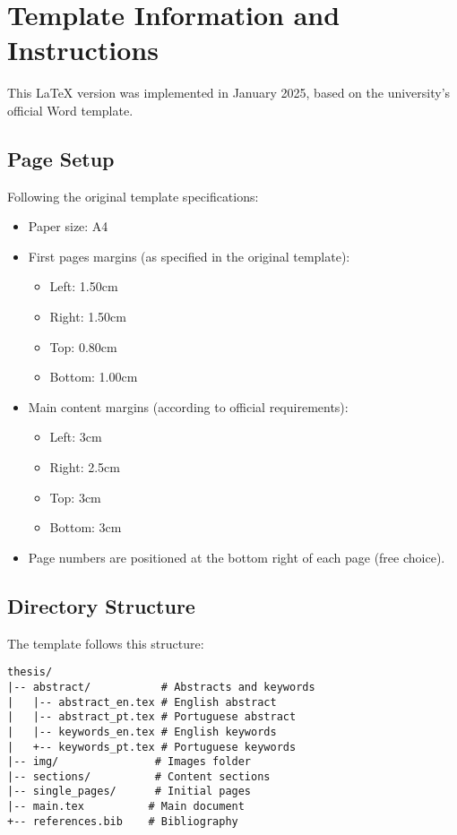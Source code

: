 \clearpage
\section{Template Information and Instructions}
This LaTeX version was implemented in January 2025, based on the university's official Word template.

\subsection{Page Setup}
Following the original template specifications:
\begin{itemize}
    \item Paper size: A4
    \item First pages margins (as specified in the original template):
    \begin{itemize}
        \item Left: 1.50cm
        \item Right: 1.50cm
        \item Top: 0.80cm
        \item Bottom: 1.00cm
    \end{itemize}
    \item Main content margins (according to official requirements):
    \begin{itemize}
        \item Left: 3cm
        \item Right: 2.5cm
        \item Top: 3cm
        \item Bottom: 3cm
    \end{itemize}
    \item Page numbers are positioned at the bottom right of each page (free choice).
\end{itemize}

\subsection{Directory Structure}
The template follows this structure:
\begin{verbatim}
thesis/
|-- abstract/           # Abstracts and keywords
|   |-- abstract_en.tex # English abstract
|   |-- abstract_pt.tex # Portuguese abstract
|   |-- keywords_en.tex # English keywords
|   +-- keywords_pt.tex # Portuguese keywords
|-- img/               # Images folder
|-- sections/          # Content sections
|-- single_pages/      # Initial pages
|-- main.tex          # Main document
+-- references.bib    # Bibliography
\end{verbatim}

